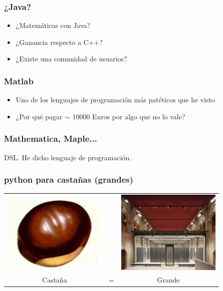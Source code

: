 \documentclass{beamer}
\begin{document}
\begin{frame}
  \frametitle{¿Java?}
  \begin{itemize}
  \item ¿Matemáticas con Java?
  \item ¿Ganancia respecto a C++?
  \item ¿Existe una comunidad de usuarios?
  \end{itemize}
\end{frame}

\begin{frame}
  \frametitle{Matlab}
  \begin{itemize}
  \item Uno de los lenguajes de programación más patéticos que he
    visto
  \item ¿Por qué pagar $\sim$ 10000 Euros por algo que no lo vale?
  \end{itemize}
\end{frame}

\begin{frame}
  \frametitle{Mathematica, Maple...}
  \begin{center}
    DSL. He dicho lenguaje de programación.
  \end{center}
\end{frame}





\begin{frame}
 \frametitle{python para castañas (grandes)}
  \begin{center}
 \begin{tabular}[h]{ccc}
   \includegraphics[width=5cm]{files/castana.jpg}& &
   \includegraphics[width=5cm]{files/marenostrum.jpg}\\
   Castaña & = & Grande
 \end{tabular}
\end{center}
\end{frame}
\end{document}
